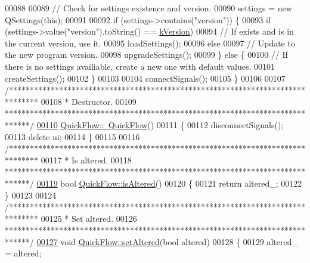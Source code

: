\begin{DoxyCode}
00088 
00089   \textcolor{comment}{// Check for settings existence and version.}
00090   settings = \textcolor{keyword}{new} QSettings(\textcolor{keyword}{this});
00091 
00092   \textcolor{keywordflow}{if} (settings->contains(\textcolor{stringliteral}{"version"})) \{
00093     \textcolor{keywordflow}{if} (settings->value(\textcolor{stringliteral}{"version"}).toString() == \hyperlink{group___window_gabfc3b1280bdae9a9c046d56b1459ab99}{kVersion})
00094       \textcolor{comment}{// If exists and is in the current version, use it.}
00095       loadSettings();
00096     \textcolor{keywordflow}{else}
00097       \textcolor{comment}{// Update to the new program version.}
00098       upgradeSettings();
00099   \} \textcolor{keywordflow}{else} \{
00100     \textcolor{comment}{// If there is no settings availiable, create a new one with default values.}
00101     createSettings();
00102   \}
00103 
00104   connectSignals();
00105 \}
00106 
00107 \textcolor{comment}{/*******************************************************************************}
00108 \textcolor{comment}{ * Destructor.}
00109 \textcolor{comment}{ ******************************************************************************/}
\hypertarget{quickflow_8cpp_source_l00110}{}\hyperlink{group___window_ga985823a0db64246b3a15eed2f397e0a4}{00110} \hyperlink{group___window_ga985823a0db64246b3a15eed2f397e0a4}{QuickFlow::~QuickFlow}()
00111 \{
00112   disconnectSignals();
00113   \textcolor{keyword}{delete} ui;
00114 \}
00115 
00116 \textcolor{comment}{/*******************************************************************************}
00117 \textcolor{comment}{ * Is altered.}
00118 \textcolor{comment}{ ******************************************************************************/}
\hypertarget{quickflow_8cpp_source_l00119}{}\hyperlink{group___window_ga5d9148467ef65c48419bf020ee107a45}{00119} \textcolor{keywordtype}{bool} \hyperlink{group___window_ga5d9148467ef65c48419bf020ee107a45}{QuickFlow::isAltered}()
00120 \{
00121   \textcolor{keywordflow}{return} altered\_;
00122 \}
00123 
00124 \textcolor{comment}{/*******************************************************************************}
00125 \textcolor{comment}{ * Set altered.}
00126 \textcolor{comment}{ ******************************************************************************/}
\hypertarget{quickflow_8cpp_source_l00127}{}\hyperlink{group___window_ga4b63ea5ca52a9eea14db0a22b5a133f8}{00127} \textcolor{keywordtype}{void} \hyperlink{group___window_ga4b63ea5ca52a9eea14db0a22b5a133f8}{QuickFlow::setAltered}(\textcolor{keywordtype}{bool} altered)
00128 \{
00129   altered\_ = altered;

\end{DoxyCode}
